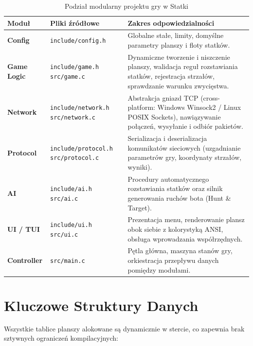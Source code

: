 \documentclass[11pt,a4paper]{article}
\begin{document}
\begin{table}[h!]
\centering
\small
\begin{tabularx}{\textwidth}{l p{4.0cm} X}
\toprule
\textbf{Moduł} & \textbf{Pliki źródłowe} & \textbf{Zakres odpowiedzialności} \\
\midrule
\textbf{Config} & \texttt{include/config.h} & Globalne stałe, limity, domyślne parametry planszy i floty statków. \\
\addlinespace[2pt]
\textbf{Game Logic} & \texttt{include/game.h} \newline \texttt{src/game.c} & Dynamiczne tworzenie i niszczenie planszy, walidacja reguł rozstawiania statków, rejestracja strzałów, sprawdzanie warunku zwycięstwa. \\
\addlinespace[2pt]
\textbf{Network} & \texttt{include/network.h} \newline \texttt{src/network.c} & Abstrakcja gniazd TCP (cross-platform: Windows Winsock2 / Linux POSIX Sockets), nawiązywanie połączeń, wysyłanie i odbiór pakietów. \\
\addlinespace[2pt]
\textbf{Protocol} & \texttt{include/protocol.h} \newline \texttt{src/protocol.c} & Serializacja i deserializacja komunikatów sieciowych (uzgadnianie parametrów gry, koordynaty strzałów, wyniki). \\
\addlinespace[2pt]
\textbf{AI} & \texttt{include/ai.h} \newline \texttt{src/ai.c} & Procedury automatycznego rozstawiania statków oraz silnik generowania ruchów bota (Hunt \& Target). \\
\addlinespace[2pt]
\textbf{UI / TUI} & \texttt{include/ui.h} \newline \texttt{src/ui.c} & Prezentacja menu, renderowanie plansz obok siebie z kolorystyką ANSI, obsługa wprowadzania współrzędnych. \\
\addlinespace[2pt]
\textbf{Controller} & \texttt{src/main.c} & Pętla główna, maszyna stanów gry, orkiestracja przepływu danych pomiędzy modułami. \\
\bottomrule
\end{tabularx}
\caption{Podział modularny projektu gry w Statki}
\end{table}

\section{Kluczowe Struktury Danych}
Wszystkie tablice planszy alokowane są dynamicznie w stercie, co zapewnia brak sztywnych ograniczeń kompilacyjnych:
\end{document}
